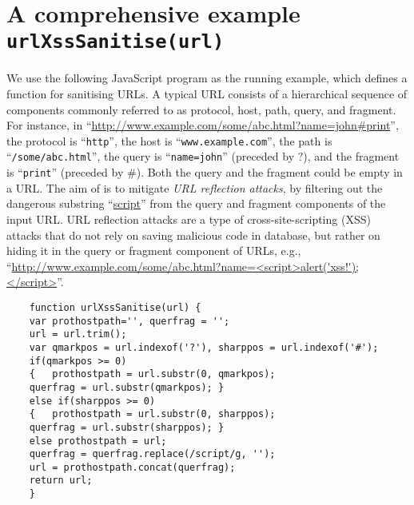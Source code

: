 
\section{A comprehensive example {\tt urlXssSanitise(url)}} \label{app:urlexample} \label{exmp:running}



%


We use the following JavaScript program as the running example,
which defines a function {\urlxsssanitise} for sanitising URLs. A typical URL consists of a hierarchical sequence of components commonly referred to as protocol, host, path, query, and fragment. For instance, in ``\url{http://www.example.com/some/abc.html?name=john#print}'', the protocol is ``{\tt http}'', the host is ``{\tt www.example.com}'', the path is ``{\tt /some/abc.html}'', the query is ``{\tt name=john}'' (preceded by $?$), and the fragment is ``{\tt print}'' (preceded by $\#$). Both the query and the fragment could be empty in a URL. The aim of {\urlxsssanitise} is to mitigate \emph{URL reflection attacks}, %
by filtering out the dangerous substring ``\url{script}'' from the query and fragment components of  the input URL. URL reflection attacks are a type of cross-site-scripting (XSS) attacks that do not rely on saving malicious code in database, but rather on hiding it in the query or fragment component of URLs, e.g., ``\url{http://www.example.com/some/abc.html?name=<script>alert('xss!');</script>}''.

{\small
	\begin{verbatim}
	function urlXssSanitise(url) {
	var prothostpath='', querfrag = '';
	url = url.trim();
	var qmarkpos = url.indexof('?'), sharppos = url.indexof('#');
	if(qmarkpos >= 0) 
	{   prothostpath = url.substr(0, qmarkpos);
	querfrag = url.substr(qmarkpos); }
	else if(sharppos >= 0)
	{   prothostpath = url.substr(0, sharppos);
	querfrag = url.substr(sharppos); }
	else prothostpath = url;
	querfrag = querfrag.replace(/script/g, '');
	url = prothostpath.concat(querfrag);
	return url;
	}
	\end{verbatim}
}

